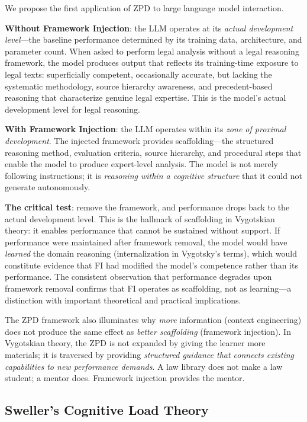 \documentclass[12pt,a4paper]{article}
\begin{document}
We propose the first application of ZPD to large language model interaction.

\textbf{Without Framework Injection}: the LLM operates at its \emph{actual development level}---the baseline performance determined by its training data, architecture, and parameter count. When asked to perform legal analysis without a legal reasoning framework, the model produces output that reflects its training-time exposure to legal texts: superficially competent, occasionally accurate, but lacking the systematic methodology, source hierarchy awareness, and precedent-based reasoning that characterize genuine legal expertise. This is the model's actual development level for legal reasoning.

\textbf{With Framework Injection}: the LLM operates within its \emph{zone of proximal development}. The injected framework provides scaffolding---the structured reasoning method, evaluation criteria, source hierarchy, and procedural steps that enable the model to produce expert-level analysis. The model is not merely following instructions; it is \emph{reasoning within a cognitive structure} that it could not generate autonomously.

\textbf{The critical test}: remove the framework, and performance drops back to the actual development level. This is the hallmark of scaffolding in Vygotskian theory: it enables performance that cannot be sustained without support. If performance were maintained after framework removal, the model would have \emph{learned} the domain reasoning (internalization in Vygotsky's terms), which would constitute evidence that FI had modified the model's competence rather than its performance. The consistent observation that performance degrades upon framework removal confirms that FI operates as scaffolding, not as learning---a distinction with important theoretical and practical implications.

The ZPD framework also illuminates why \emph{more} information (context engineering) does not produce the same effect as \emph{better scaffolding} (framework injection). In Vygotskian theory, the ZPD is not expanded by giving the learner more materials; it is traversed by providing \emph{structured guidance that connects existing capabilities to new performance demands}. A law library does not make a law student; a mentor does. Framework injection provides the mentor.

\subsection{Sweller's Cognitive Load Theory}
\end{document}
